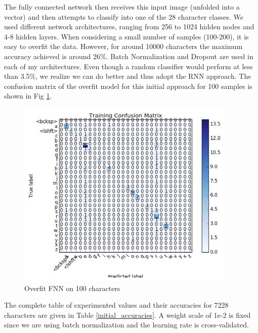 \documentclass[10pt,twocolumn,letterpaper]{article}
\begin{document}
The fully connected network then receives this input image (unfolded into a vector) and then attempts to classify into one of the 28 character classes. We used different network architectures, ranging from 256 to 1024 hidden nodes and 4-8 hidden layers. When considering a small number of samples (100-200), it is easy to overfit the data. However, for around 10000 characters the maximum accuracy achieved is around 26\%. Batch Normalization and Dropout are used in each of my architectures. Even though a random classifier would perform at less than 3.5\%, we realize we can do better and thus adopt the RNN approach. The confusion matrix of the overfit model for this initial approach for 100 samples is shown in Fig \ref{fig:overfit}.
\begin{figure}[t]
\begin{center}
   \includegraphics[width=0.99\linewidth]{./overfit_model.jpg}
\end{center}
   \caption{Overfit FNN on 100 characters}
\label{fig:overfit}
\end{figure}

The complete table of experimented values and their accuracies for 7228 characters are given in Table \ref{initial_accuracies}. A weight scale of 1e-2 is fixed since we are using batch normalization and the learning rate is cross-validated.
\end{document}
